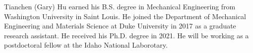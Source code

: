 \biography

Tianchen (Gary) Hu earned his B.S. degree in Mechanical Engineering from Washington University in Saint Louis. He joined the Department of Mechanical Engineering and Materials Science at Duke University in 2017 as a graduate research assistant. He received his Ph.D. degree in 2021. He will be working as a postdoctoral fellow at the Idaho National Laborotary.
